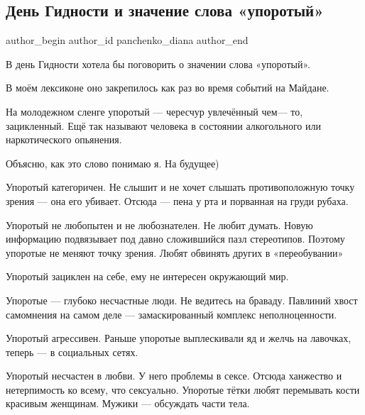  
 
 
 
 
 
\subsection{День Гидности и значение слова «упоротый»}
\label{sec:21_11_2021.fb.panchenko_diana.1.den_gidnosti_uporotyj_slovo}
 
\ifcmt
 author_begin
   author_id panchenko_diana
 author_end
\fi

В день Гидности хотела бы поговорить о значении слова «упоротый». 

В моём лексиконе оно закрепилось как раз во время событий на Майдане. 

На молодежном сленге упоротый — чересчур увлечённый чем— то, зацикленный. Ещё
так называют человека в состоянии алкогольного или наркотического опьянения. 

Объясню, как это слово понимаю я. На будущее) 

Упоротый категоричен. Не слышит и не хочет слышать противоположную точку зрения
— она его убивает. Отсюда — пена у рта и порванная на груди рубаха. 

Упоротый не любопытен и не любознателен. Не любит думать. Новую информацию
подвязывает под давно сложившийся пазл стереотипов. Поэтому упоротые не меняют
точку зрения. Любят обвинять других в «переобувании»

Упоротый зациклен на себе, ему не интересен окружающий мир. 

Упоротые — глубоко несчастные люди. Не ведитесь на браваду. Павлиний хвост
самомнения на самом деле —  замаскированный комплекс неполноценности. 

Упоротый агрессивен. Раньше упоротые выплескивали яд и желчь на лавочках,
теперь — в социальных сетях. 

Упоротый несчастен в любви. У него проблемы в сексе. Отсюда ханжество и
нетерпимость ко всему, что сексуально. Упоротые тётки любят перемывать кости
красивым женщинам. Мужики — обсуждать части тела. 

